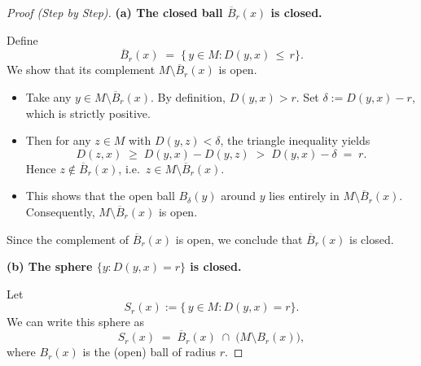 \documentclass[12pt]{article}
\theoremstyle{definition} %
\theoremstyle{plain} %
\begin{document}
                        \begin{proof}[Proof (Step by Step)]
                        
                        \textbf{(a) The closed ball $\overline{B}_r(x)$ is closed.}
                        
                        Define
                        \[
                        \overline{B}_r(x) \;=\; \{\, y \in M : D(y,x) \,\le\, r\}.
                        \]
                        We show that its complement $M \setminus \overline{B}_r(x)$ is open.  
                        
                        \begin{itemize}
                        \item Take any $y \in M \setminus \overline{B}_r(x)$.  
                           By definition, $D(y,x) > r$.  
                           Set $\delta := D(y,x) - r$, which is strictly positive.  
                        \item Then for any $z \in M$ with $D(y,z) < \delta$, the triangle inequality yields
                        \[
                        D(z,x) \;\ge\; D(y,x) - D(y,z) \;>\; D(y,x) - \delta \;=\; r.
                        \]
                        Hence $z \notin \overline{B}_r(x)$, i.e.\ $z \in M \setminus \overline{B}_r(x)$.  
                        \item This shows that the open ball $B_\delta(y)$ around $y$ lies entirely in $M \setminus \overline{B}_r(x)$.  
                           Consequently, $M \setminus \overline{B}_r(x)$ is open.  
                        \end{itemize}
                        
                        Since the complement of $\overline{B}_r(x)$ is open, we conclude that $\overline{B}_r(x)$ is closed.
                        
                        \medskip
                        
                        \textbf{(b) The sphere $\{y : D(y,x) = r\}$ is closed.}
                        
                        Let 
                        \[
                        S_r(x) := \{\,y \in M : D(y,x) = r\}.
                        \]
                        We can write this sphere as 
                        \[
                        S_r(x) \;=\; \overline{B}_r(x) \;\cap\; \bigl(M \setminus B_r(x)\bigr),
                        \]
                        where $B_r(x)$ is the (open) ball of radius $r$.  
                        

\end{proof}
\end{document}
